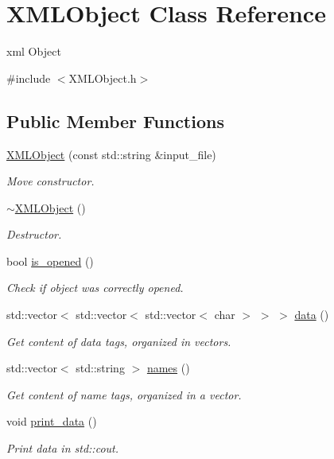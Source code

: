 \hypertarget{class_x_m_l_object}{}\section{X\+M\+L\+Object Class Reference}
\label{class_x_m_l_object}


xml Object  




{\ttfamily \#include $<$X\+M\+L\+Object.\+h$>$}

\subsection*{Public Member Functions}
\begin{DoxyCompactItemize}
\item 
\mbox{\hyperlink{class_x_m_l_object_a4bc5942fe99811ae8aadd1d59e372063}{X\+M\+L\+Object}} (const std\+::string \&input\+\_\+file)
\begin{DoxyCompactList}\small\item\em Move constructor. \end{DoxyCompactList}\item 
\mbox{\hyperlink{class_x_m_l_object_a2dd56725772090aff6c954651d3ddebb}{$\sim$\+X\+M\+L\+Object}} ()
\begin{DoxyCompactList}\small\item\em Destructor. \end{DoxyCompactList}\item 
bool \mbox{\hyperlink{class_x_m_l_object_a14d88964a98069618d6eb370fdb5bcc8}{is\+\_\+opened}} ()
\begin{DoxyCompactList}\small\item\em Check if object was correctly opened. \end{DoxyCompactList}\item 
std\+::vector$<$ std\+::vector$<$ std\+::vector$<$ char $>$ $>$ $>$ \mbox{\hyperlink{class_x_m_l_object_ad13f036055b76b4d2d08e64f85703df0}{data}} ()
\begin{DoxyCompactList}\small\item\em Get content of data tags, organized in vectors. \end{DoxyCompactList}\item 
std\+::vector$<$ std\+::string $>$ \mbox{\hyperlink{class_x_m_l_object_ad418af64a7ad3050842e7901ffd0c309}{names}} ()
\begin{DoxyCompactList}\small\item\em Get content of name tags, organized in a vector. \end{DoxyCompactList}\item 
void \mbox{\hyperlink{class_x_m_l_object_ac1819fca641e9dd77c0523b840244819}{print\+\_\+data}} ()
\begin{DoxyCompactList}\small\item\em Print data in std\+::cout. \end{DoxyCompactList}\end{DoxyCompactItemize}


